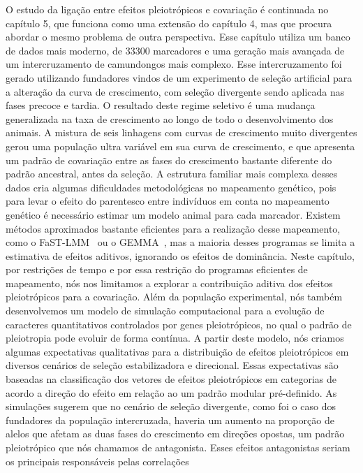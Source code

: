 \begin{refsection}
O estudo da ligação entre efeitos pleiotrópicos e covariação é continuada no
capítulo 5, que funciona como uma extensão do capítulo 4, mas que procura
abordar o mesmo problema de outra perspectiva. Esse capítulo utiliza um banco
de dados mais moderno, de 33300 marcadores e uma geração mais avançada
de um intercruzamento de camundongos mais complexo. Esse intercruzamento foi
gerado utilizando fundadores vindos de um experimento de seleção artificial
para a alteração da curva de crescimento, com seleção divergente sendo
aplicada nas fases precoce e tardia. O resultado deste regime seletivo é uma
mudança generalizada na taxa de crescimento ao longo de todo o desenvolvimento
dos animais. A mistura de seis linhagens com curvas de crescimento muito
divergentes gerou uma população ultra variável em sua curva de crescimento, e
que apresenta um padrão de covariação entre as fases do crescimento bastante
diferente do padrão ancestral, antes da seleção. A estrutura familiar mais
complexa desses dados cria algumas dificuldades metodológicas no mapeamento
genético, pois para levar o efeito do parentesco entre indivíduos em conta no
mapeamento genético é necessário estimar um modelo animal para cada marcador.
Existem métodos aproximados bastante eficientes para a realização desse
mapeamento, como o FaST-LMM~\parencite{Lippert2011-jn} ou o
GEMMA~\parencite{Zhou2012-zl}, mas a maioria desses programas se limita a
estimativa de efeitos aditivos, ignorando os efeitos de dominância. Neste
capítulo, por restrições de tempo e por essa restrição do programas eficientes
de mapeamento, nós nos limitamos a explorar a contribuição aditiva dos efeitos
pleiotrópicos para a covariação. Além da população experimental, nós também
desenvolvemos um modelo de simulação computacional para a evolução de
caracteres quantitativos controlados por genes pleiotrópicos, no qual o padrão
de pleiotropia pode evoluir de forma contínua. A partir deste modelo, nós
criamos algumas expectativas qualitativas para a distribuição de efeitos
pleiotrópicos em diversos cenários de seleção estabilizadora e direcional.
Essas expectativas são baseadas na classificação dos vetores de efeitos
pleiotrópicos em categorias de acordo a direção do efeito em relação ao um
padrão modular pré-definido. As simulações sugerem que no cenário de seleção
divergente, como foi o caso dos fundadores da população intercruzada, haveria
um aumento na proporção de alelos que afetam as duas fases do crescimento em
direções opostas, um padrão pleiotrópico que nós chamamos de antagonista.
Esses efeitos antagonistas seriam os principais responsáveis pelas correlações

\end{refsection}
